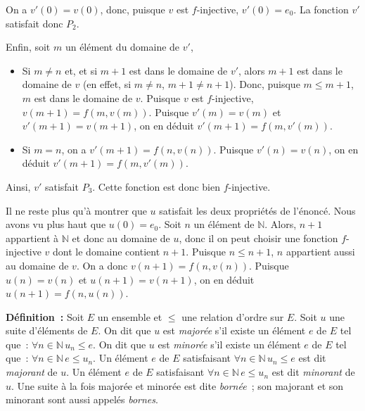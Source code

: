 On a $v'(0) = v(0)$, donc, puisque $v$ est $f$-injective, $v'(0) = e_0$. 
La fonction $v'$ satisfait donc $P_2$. 

Enfin, soit $m$ un élément du domaine de $v'$, 
\begin{itemize}[nosep]
    \item Si $m \neq n$ et, et si $m+1$ est dans le domaine de $v'$, alors $m+1$ est dans le domaine de $v$ (en effet, si $m \neq n$, $m+1 \neq n+1$). 
        Donc, puisque $m \leq m+1$, $m$ est dans le domaine de $v$. 
        Puisque $v$ est $f$-injective, $v(m+1) = f(m, v(m))$. 
        Puisque $v'(m) = v(m)$ et $v'(m+1) = v(m+1)$, on en déduit $v'(m+1) = f(m, v'(m))$.
    \item Si $m = n$, on a $v'(m+1) = f(n, v(n))$. Puisque $v'(n) = v(n)$, on en déduit $v'(m+1) = f(m,v'(m))$.
\end{itemize}
Ainsi, $v'$ satisfait $P_3$. 
Cette fonction est donc bien $f$-injective.

Il ne reste plus qu'à montrer que $u$ satisfait les deux propriétés de l'énoncé. 
Nous avons vu plus haut que $u(0) = e_0$. 
Soit $n$ un élément de $\mathbb{N}$. 
Alors, $n+1$ appartient à $\mathbb{N}$ et donc au domaine de $u$, donc il on peut choisir une fonction $f$-injective $v$ dont le domaine contient $n+1$. 
Puisque $n \leq n+1$, $n$ appartient aussi au domaine de $v$. 
On a donc $v(n+1) = f(n, v(n))$. 
Puisque $u(n) = v(n)$ et $u(n+1) = v(n+1)$, on en déduit $u(n+1) = f(n, u(n))$.

\done

\medskip

\noindent\textbf{Définition :}
    Soit $E$ un ensemble et $\leq$ une relation d'ordre sur $E$.
    Soit $u$ une suite d'éléments de $E$. 
    On dit que $u$ est \emph{majorée} s'il existe un élément $e$ de $E$ tel que : $\forall n \in \mathbb{N} \, u_n \leq e$.
    On dit que $u$ est \emph{minorée} s'il existe un élément $e$ de $E$ tel que : $\forall n \in \mathbb{N} \, e \leq u_n$.
    Un élément $e$ de $E$ satisfaisant $\forall n \in \mathbb{N} \, u_n \leq e$ est dit \emph{majorant} de $u$.
    Un élément $e$ de $E$ satisfaisant $\forall n \in \mathbb{N} \, e \leq u_n$ est dit \emph{minorant} de $u$.
    Une suite à la fois majorée et minorée est dite \emph{bornée} ; son majorant et son minorant sont aussi appelés \emph{bornes}. 

\medskip

